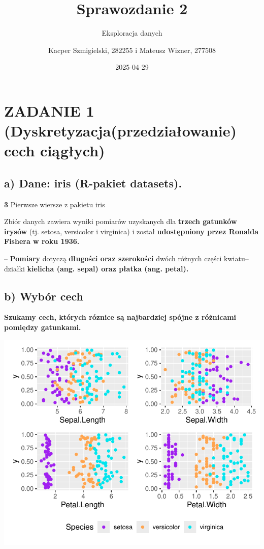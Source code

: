 \documentclass[
  12pt,
]{article}
\title{Sprawozdanie 2}
\subtitle{Eksploracja danych}
\author{Kacper Szmigielski, 282255 i Mateusz Wizner, 277508}
\date{2025-04-29}
\begin{document}
\maketitle

{
\setcounter{tocdepth}{3}
\tableofcontents
}
\section{ZADANIE 1 (Dyskretyzacja(przedziałowanie) cech
ciągłych)}\label{zadanie-1-dyskretyzacjaprzedziaux142owanie-cech-ciux105gux142ych}

\subsection{a) Dane: iris (R-pakiet
datasets).}\label{a-dane-iris-r-pakiet-datasets.}

\textbf{3} Pierwsze wiersze z pakietu iris

Zbiór danych zawiera wyniki pomiarów uzyskanych dla \textbf{trzech
gatunków irysów} (tj. setosa, versicolor i virginica) i został
\textbf{udostępniony przez Ronalda Fishera w roku 1936.}

-- \textbf{Pomiary} dotyczą \textbf{długości oraz szerokości} dwóch
różnych części kwiatu-- działki \textbf{kielicha (ang. sepal) oraz
płatka (ang. petal).}

\subsection{b) Wybór cech}\label{b-wybuxf3r-cech}

\textbf{Szukamy cech, których róznice są najbardziej spójne z różnicami
pomiędzy gatunkami.}

\begin{center}\includegraphics{Sprawozdanie2_files/figure-latex/zad1b1-1} \end{center}
\end{document}
